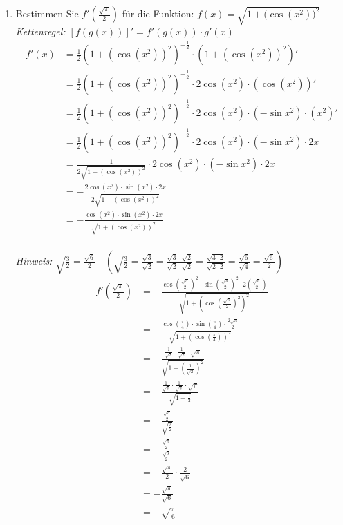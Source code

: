 \documentclass[12pt]{article}
\begin{document}
\begin{enumerate}[start=1,label={\bfseries Frage \arabic*:},leftmargin=1in]
    \item Bestimmen Sie $f'(\frac{\sqrt{\pi}}{2})$ für die Funktion: $f(x)=\sqrt{1+(\cos{(x^2))^2}}$ \\
    \textit{Kettenregel: $[f(g(x))]'=f'(g(x)) \cdot g'(x)$} \\
    \begin{align*}
        f'(x)&=\frac{1}{2}(1+(\cos{(x^2)})^2)^{-\frac{1}{2}} \cdot (1+(\cos{(x^2)})^2)' \\
        &= \frac{1}{2}(1+(\cos{(x^2)})^2)^{-\frac{1}{2}} \cdot 2\cos{(x^2)} \cdot (\cos{(x^2)})' \\
        &= \frac{1}{2}(1+(\cos{(x^2)})^2)^{-\frac{1}{2}} \cdot 2\cos{(x^2)} \cdot (-\sin{x^2}) \cdot (x^2)' \\
        &= \frac{1}{2}(1+(\cos{(x^2)})^2)^{-\frac{1}{2}} \cdot 2\cos{(x^2)} \cdot (-\sin{x^2}) \cdot 2x \\
        &= \frac{1}{2\sqrt{1+(\cos{(x^2)})^2}} \cdot 2\cos{(x^2)} \cdot (-\sin{x^2}) \cdot 2x \\  
        &= -\frac{2\cos{(x^2)} \cdot \sin{(x^2)} \cdot 2x}{2\sqrt{1+(\cos{(x^2)})^2}} \\
        &= -\frac{\cos{(x^2)} \cdot \sin{(x^2)} \cdot 2x}{\sqrt{1+(\cos{(x^2)})^2}} \\
    \end{align*}

    \enlargethispage{-\baselineskip}
    
    \textit{Hinweis: $\sqrt{\frac{3}{2}} = \frac{\sqrt{6}}{2} \quad (\sqrt{\frac{3}{2}} = \frac{\sqrt{3}}{\sqrt{2}} = \frac{\sqrt{3} \cdot \sqrt{2}}{\sqrt{2} \cdot \sqrt{2}} = \frac{\sqrt{3 \cdot 2}}{\sqrt{2 \cdot 2}} = \frac{\sqrt{6}}{\sqrt{4}} = \frac{\sqrt{6}}{2})$} \\
    
    \begin{align*}
        f'(\frac{\sqrt{\pi}}{2})&=-\frac{\cos{(\frac{\sqrt{\pi}}{2})^2} \cdot \sin{(\frac{\sqrt{\pi}}{2})^2} \cdot 2(\frac{\sqrt{\pi}}{2})}{\sqrt{1 + (\cos{(\frac{\sqrt{\pi}}{2})^2})^2}} \\
        &=-\frac{\cos{(\frac{\pi}{4})} \cdot \sin{(\frac{\pi}{4})} \cdot \frac{2\sqrt{\pi}}{2}}{\sqrt{1 + (\cos{(\frac{\pi}{4})})^2}} \\
        &= -\frac{\frac{1}{\sqrt{2}} \cdot \frac{1}{\sqrt{2}} \cdot \sqrt{\pi}}{\sqrt{1 + (\frac{1}{\sqrt{2}})^2}} \\
        &= -\frac{\frac{1}{\sqrt{2}} \cdot \frac{1}{\sqrt{2}} \cdot \sqrt{\pi}}{\sqrt{1 + \frac{1}{2}}} \\
        &= -\frac{\frac{\sqrt{\pi}}{2}}{\sqrt{\frac{3}{2}}} \\
        &= -\frac{\frac{\sqrt{\pi}}{2}}{\frac{\sqrt{6}}{2}} \\
        &= -\frac{\sqrt{\pi}}{2} \cdot \frac{2}{\sqrt{6}} \\
        &= -\frac{\sqrt{\pi}}{\sqrt{6}} \\
        &= -\sqrt{\frac{\pi}{6}} \\
    \end{align*}       

\end{enumerate}
\end{document}
